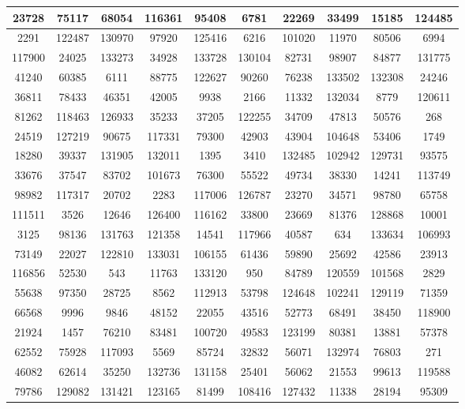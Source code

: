 \documentclass[12pt]{article}
\begin{document}
\begin{appendices}
\begin{table}[H]
\begin{tabular}{|c|c|c|c|c|c|c|c|c|c|}
		23728	& 75117	& 68054	& 116361	& 95408	& 6781	& 22269	& 33499	& 15185	& 124485	\\ \hline
		2291	& 122487	& 130970	& 97920	& 125416	& 6216	& 101020	& 11970	& 80506	& 6994	\\ \hline
		117900	& 24025	& 133273	& 34928	& 133728	& 130104	& 82731	& 98907	& 84877	& 131775	\\ \hline
		41240	& 60385	& 6111	& 88775	& 122627	& 90260	& 76238	& 133502	& 132308	& 24246	\\ \hline
		36811	& 78433	& 46351	& 42005	& 9938	& 2166	& 11332	& 132034	& 8779	& 120611	\\ \hline
		81262	& 118463	& 126933	& 35233	& 37205	& 122255	& 34709	& 47813	& 50576	& 268	\\ \hline
		24519	& 127219	& 90675	& 117331	& 79300	& 42903	& 43904	& 104648	& 53406	& 1749	\\ \hline
		18280	& 39337	& 131905	& 132011	& 1395	& 3410	& 132485	& 102942	& 129731	& 93575	\\ \hline
		33676	& 37547	& 83702	& 101673	& 76300	& 55522	& 49734	& 38330	& 14241	& 113749	\\ \hline
		98982	& 117317	& 20702	& 2283	& 117006	& 126787	& 23270	& 34571	& 98780	& 65758	\\ \hline
		111511	& 3526	& 12646	& 126400	& 116162	& 33800	& 23669	& 81376	& 128868	& 10001	\\ \hline
		3125	& 98136	& 131763	& 121358	& 14541	& 117966	& 40587	& 634	& 133634	& 106993	\\ \hline
		73149	& 22027	& 122810	& 133031	& 106155	& 61436	& 59890	& 25692	& 42586	& 23913	\\ \hline
		116856	& 52530	& 543	& 11763	& 133120	& 950	& 84789	& 120559	& 101568	& 2829	\\ \hline
		55638	& 97350	& 28725	& 8562	& 112913	& 53798	& 124648	& 102241	& 129119	& 71359	\\ \hline
		66568	& 9996	& 9846	& 48152	& 22055	& 43516	& 52773	& 68491	& 38450	& 118900	\\ \hline
		21924	& 1457	& 76210	& 83481	& 100720	& 49583	& 123199	& 80381	& 13881	& 57378	\\ \hline
		62552	& 75928	& 117093	& 5569	& 85724	& 32832	& 56071	& 132974	& 76803	& 271	\\ \hline
		46082	& 62614	& 35250	& 132736	& 131158	& 25401	& 56062	& 21553	& 99613	& 119588	\\ \hline
		79786	& 129082	& 131421	& 123165	& 81499	& 108416	& 127432	& 11338	& 28194	& 95309	\\ \hline

\end{tabular}
\end{table}
\end{appendices}
\end{document}
